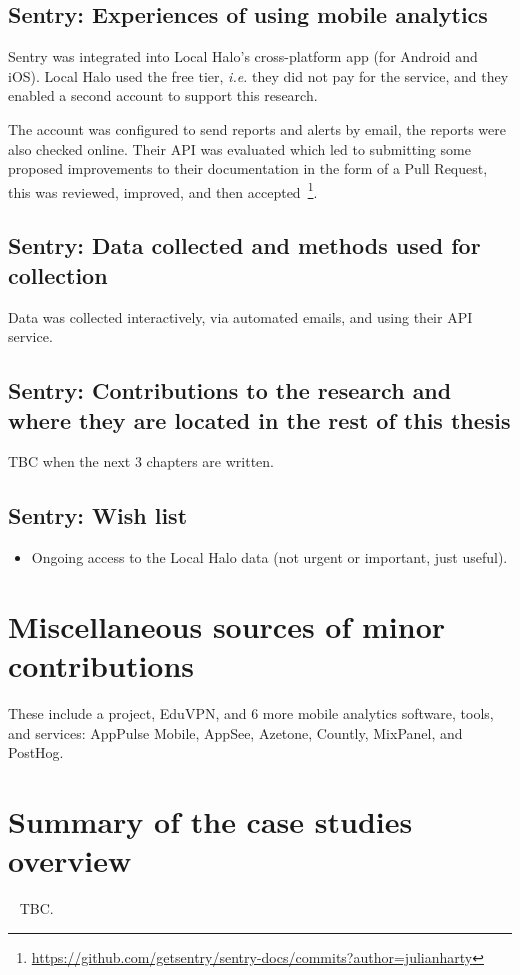\subsection{Sentry: Experiences of using mobile analytics}
Sentry was integrated into Local Halo's cross-platform app (for Android and iOS). Local Halo used the free tier, \emph{i.e.} they did not pay for the service, and they enabled a second account to support this research.

The account was configured to send reports and alerts by email, the reports were also checked online. Their API was evaluated which led to submitting some proposed improvements to their documentation in the form of a Pull Request, this was reviewed, improved, and then accepted~\footnote{\url{https://github.com/getsentry/sentry-docs/commits?author=julianharty}}.

\subsection{Sentry: Data collected and methods used for collection}

Data was collected interactively, via automated emails, and using their API service.

\subsection{Sentry: Contributions to the research and where they are located in the rest of this thesis}
TBC when the next 3 chapters are written.

\subsection*{Sentry: Wish list}
{\small
\begin{itemize}
    \item Ongoing access to the Local Halo data (not urgent or important, just useful).
\end{itemize}
}

\clearpage


\section{Miscellaneous sources of minor contributions}

These include a project, EduVPN, and 6 more mobile analytics software, tools, and services: AppPulse Mobile, AppSee, Azetone, Countly, MixPanel, and PostHog.

\clearpage


\section{Summary of the case studies overview}~\label{case-study-overview-summary}
TBC.

